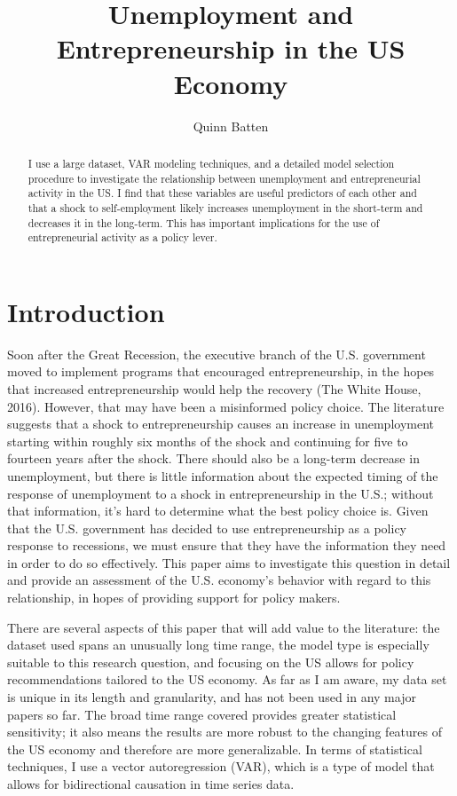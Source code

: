 \documentclass[]{ecca}
\title{Unemployment and Entrepreneurship in the US Economy}
\author{Quinn Batten}
\begin{document}
\maketitle

\begin{abstract}

I use a large dataset, VAR modeling techniques, and a detailed model selection procedure to investigate the relationship between unemployment and entrepreneurial activity in the US. I find that these variables are useful predictors of each other and that a shock to self-employment likely increases unemployment in the short-term and decreases it in the long-term. This has important implications for the use of entrepreneurial activity as a policy lever.

\end{abstract}

\section*{Introduction}
Soon after the Great Recession, the executive branch of the U.S. government moved to implement programs that encouraged entrepreneurship, in the hopes that increased entrepreneurship would help the recovery (The White House, 2016). However, that may have been a misinformed policy choice. The literature suggests that a shock to entrepreneurship causes an increase in unemployment starting within roughly six months of the shock and continuing for five to fourteen years after the shock. There should also be a long-term decrease in unemployment, but there is little information about the expected timing of the response of unemployment to a shock in entrepreneurship in the U.S.; without that information, it's hard to determine what the best policy choice is. Given that the U.S. government has decided to use entrepreneurship as a policy response to recessions, we must ensure that they have the information they need in order to do so effectively. This paper aims to investigate this question in detail and provide an assessment of the U.S. economy's behavior with regard to this relationship, in hopes of providing support for policy makers. 

There are several aspects of this paper that will add value to the literature: the dataset used spans an unusually long time range, the model type is especially suitable to this research question, and focusing on the US allows for policy recommendations tailored to the US economy. As far as I am aware, my data set is unique in its length and granularity, and has not been used in any major papers so far. The broad time range covered provides greater statistical sensitivity; it also means the results are more robust to the changing features of the US economy and therefore are more generalizable. In terms of statistical techniques, I use a vector autoregression (VAR), which is a type of model that allows for bidirectional causation in time series data.
\end{document}

